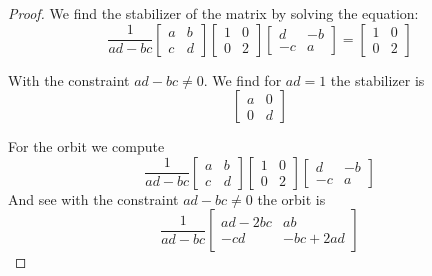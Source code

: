 \documentclass[12pt]{article}
\begin{document}
\begin{proof}
    We find the stabilizer of the matrix by solving the equation:
    \[
        \frac{1}{ad - bc} 
        \left[
            \begin{array}{cc}
                a & b \\
                c & d
            \end{array}
        \right]
        \left[
            \begin{array}{cc}
                1 & 0 \\
                0 & 2
            \end{array}
        \right]
        \left[
            \begin{array}{cc}
                d &-b \\
               -c & a
            \end{array}
        \right]
        =
        \left[
            \begin{array}{cc}
                1 & 0 \\
                0 & 2
            \end{array}
        \right]
    \]
    
    With the constraint $ad - bc \neq 0$. We find for $ad = 1$ the
    stabilizer is 
    \[
        \left[
            \begin{array}{cc}
                a & 0 \\
                0 & d
            \end{array}
        \right]
    \]

    For the orbit we compute
    \[
        \frac{1}{ad - bc} 
        \left[
            \begin{array}{cc}
                a & b \\
                c & d
            \end{array}
        \right]
        \left[
            \begin{array}{cc}
                1 & 0 \\
                0 & 2
            \end{array}
        \right]
        \left[
            \begin{array}{cc}
                d &-b \\
               -c & a
            \end{array}
        \right]
    \]
    And see with the constraint $ad - bc \neq 0$ the orbit is
    \[
        \frac{1}{ad - bc}
        \left[
            \begin{array}{cc}
                ad - 2bc & ab \\
                -cd & -bc + 2ad
            \end{array}
        \right]
    \]

\end{proof}
\end{document}

